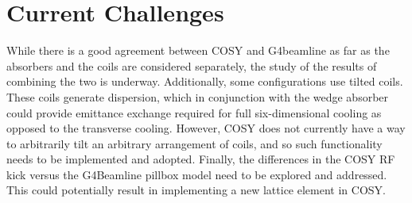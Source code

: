 \documentclass{jacow}
\begin{document}
\section{Current Challenges}
While there is a good agreement between COSY and G4beamline as far as the absorbers and the coils are considered separately, the study of the results of combining the two is underway. Additionally, some configurations use tilted coils. These coils generate dispersion, which in conjunction with the wedge absorber could provide emittance exchange required for full six-dimensional cooling as opposed to the transverse cooling. However, COSY does not currently have a way to arbitrarily tilt an arbitrary arrangement of coils, and so such functionality needs to be implemented and adopted. Finally, the differences in the COSY RF kick versus the G4Beamline pillbox model need to be explored and addressed. This could potentially result in implementing a new lattice element in COSY.

{}

\mbox{}
\end{document}
